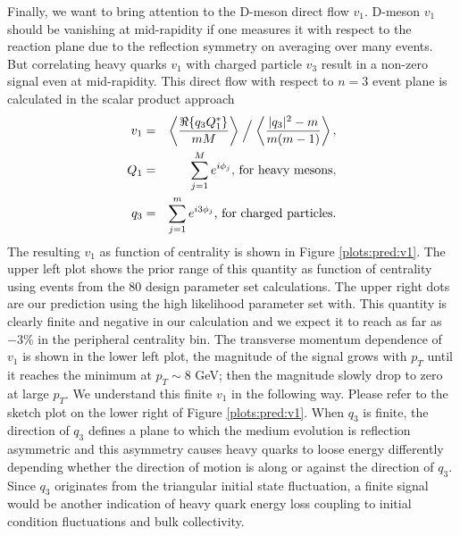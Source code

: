 \documentclass[aps, prc, reprint, amsmath, groupedaddress, nofootinbib]{revtex4-1}
\begin{document}
Finally, we want to bring attention to the D-meson direct flow $v_1$.
D-meson $v_1$ should be vanishing at mid-rapidity if one measures it with respect to the reaction plane due to the reflection symmetry on averaging over many events.
But correlating heavy quarks $v_1$ with charged particle $v_3$ result in a non-zero signal even at mid-rapidity.
This direct flow with respect to $n=3$ event plane is calculated in the scalar product approach
\begin{eqnarray}
v_1 &=& \left\langle \frac{\Re\{q_3 Q_1^*\}}{mM} \right\rangle\Bigm/\left\langle \frac{|q_3|^2-m}{m(m-1)} \right\rangle,\\
Q_1 &=& \sum_{j=1}^{M}e^{i\phi_j} \textrm{, for heavy mesons},\nonumber\\
q_3 &=& \sum_{j=1}^{m}e^{i3\phi_j} \textrm{, for charged particles}. \nonumber
\end{eqnarray}
The resulting $v_1$ as function of centrality is shown in Figure \ref{plots:pred:v1}.
The upper left plot shows the prior range of this quantity as function of centrality using events from the 80 design parameter set calculations.
The upper right dots are our prediction using the high likelihood parameter set with.
This quantity is clearly finite and negative in our calculation and we expect it to reach as far as $-3\%$ in the peripheral centrality bin.
The transverse momentum dependence of $v_1$ is shown in the lower left plot, the magnitude of the signal grows with $p_T$ until it reaches the minimum at $p_T \sim 8$ GeV; then the magnitude slowly drop to zero at large $p_T$.
We understand this finite $v_1$ in the following way.
Please refer to the sketch plot on the lower right of Figure \ref{plots:pred:v1}.
When $q_3$ is finite, the direction of $q_3$ defines a plane to which the medium evolution is reflection asymmetric and this asymmetry causes heavy quarks to loose energy differently depending whether the direction of motion is along or against the direction of $q_3$.
Since $q_3$ originates from the triangular initial state fluctuation, a finite signal would be another indication of heavy quark energy loss coupling to initial condition fluctuations and bulk collectivity.
\end{document}

